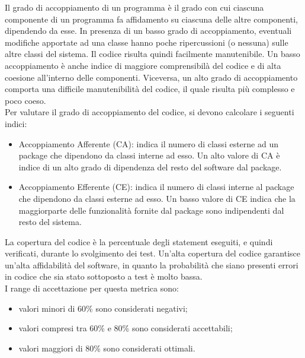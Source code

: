 		Il grado di accoppiamento di un programma è il grado con cui ciascuna componente di un programma fa affidamento su ciascuna delle altre componenti, dipendendo da esse. In presenza di un basso grado di accoppiamento, eventuali modifiche apportate ad una classe hanno poche ripercussioni (o nessuna) sulle altre classi del sistema. Il codice risulta quindi facilmente manutenibile. Un basso accoppiamento è anche indice di maggiore comprensibilà del codice e di alta coesione all'interno delle componenti. Viceversa, un alto grado di accoppiamento comporta una difficile manutenibilità del codice, il quale risulta più complesso e poco coeso.\\
		Per valutare il grado di accoppiamento del codice, si devono calcolare i seguenti indici:
		\begin{itemize}
			\item Accoppiamento Afferente (CA): indica il numero di classi esterne ad un package che dipendono da classi interne ad esso. Un alto valore di CA è indice di un alto grado di dipendenza del resto del software dal package.
			\item Accoppiamento Efferente (CE): indica il numero di classi interne al package che dipendono da classi esterne ad esso. Un basso valore di CE indica che la maggiorparte delle funzionalità fornite dal package sono indipendenti dal resto del sistema.
		\end{itemize}
		La copertura del codice è la percentuale degli statement eseguiti, e quindi verificati, durante lo svolgimento dei test. Un'alta copertura del codice garantisce un'alta affidabilità del software, in quanto la probabilità che siano presenti errori in codice che sia stato sottoposto a test è molto bassa.\\
		I range di accettazione per questa metrica sono:
		\begin{itemize}
			\item valori minori di 60\% sono considerati negativi;
			\item valori compresi tra 60\% e 80\% sono considerati accettabili;
			\item valori maggiori di 80\% sono considerati ottimali.
		\end{itemize}
